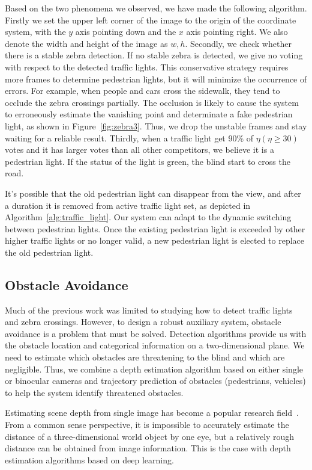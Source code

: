 Based on the two phenomena we observed, we have made the following algorithm. Firstly we set the upper left corner of the image to the origin of the coordinate system, with the $y$ axis pointing down and the $x$ axis pointing right. We also denote the width and height of the image as $w, h$. Secondly, we check whether there is a stable zebra detection. If no stable zebra is detected, we give no voting with respect to the detected traffic lights. This conservative strategy requires more frames to determine pedestrian lights, but it will minimize the occurrence of errors. For example, when people and cars cross the sidewalk, they tend to occlude the zebra crossings partially. The occlusion is likely to cause the system to erroneously estimate the vanishing point and determinate a fake pedestrian light, as shown in Figure~\ref{fig:zebra3}. Thus, we drop the unstable frames and stay waiting for a reliable result. Thirdly, when a traffic light get 90\% of $\eta(\eta\ge 30)$ votes and it has larger votes than all other competitors, we believe it is a pedestrian light. If the status of the light is green, the blind start to cross the road.

It's possible that the old pedestrian light can disappear from the view, and after a duration it is removed from active traffic light set, as depicted in Algorithm~\ref{alg:traffic_light}. Our system can adapt to the dynamic switching between pedestrian lights. Once the existing pedestrian light is exceeded by other higher traffic lights or no longer valid, a new pedestrian light is elected to replace the old pedestrian light.



\subsection{Obstacle Avoidance}
Much of the previous work was limited to studying how to detect traffic lights and zebra crossings. However, to design a robust auxiliary system, obstacle avoidance is a problem that must be solved. Detection algorithms provide us with the obstacle location and categorical information on a two-dimensional plane. We need to estimate which obstacles are threatening to the blind and which are negligible. Thus, we combine a depth estimation algorithm based on either single or binocular cameras and trajectory prediction of obstacles (pedestrians, vehicles) to help the system identify threatened obstacles.


Estimating scene depth from single image has become a popular research field~\cite{}. From a common sense perspective, it is impossible to accurately estimate the distance of a three-dimensional world object by one eye, but a relatively rough distance can be obtained from image information. This is the case with depth estimation algorithms based on deep learning.




